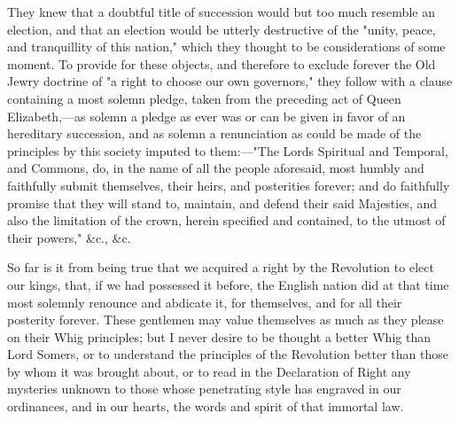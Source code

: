 They knew that a doubtful title of succession would but too much resemble an election, and that an election would be utterly destructive of the "unity, peace, and tranquillity of this nation," which they thought to be considerations of some moment. To provide for these objects, and therefore to exclude forever the Old Jewry doctrine of "a right to choose our own governors," they follow with a clause containing a most solemn pledge, taken from the preceding act of Queen Elizabeth,—as solemn a pledge as ever was or can be given in favor of an hereditary succession, and as solemn a renunciation as could be made of the principles by this society imputed to them:—"The Lords Spiritual and Temporal, and Commons, do, in the name of all the people aforesaid, most humbly and faithfully submit themselves, their heirs, and posterities forever; and do faithfully promise that they will stand to, maintain, and defend their said Majesties, and also the limitation of the crown, herein specified and contained, to the utmost of their powers," \&c., \&c.

So far is it from being true that we acquired a right by the Revolution to elect our kings, that, if we had possessed it before, the English nation did at that time most solemnly renounce and abdicate it, for themselves, and for all their posterity forever. These gentlemen may value themselves as much as they please on their Whig principles; but I never desire to be thought a better Whig than Lord Somers, or to understand the principles of the Revolution better than those by whom it was brought about, or to read in the Declaration of Right any mysteries unknown to those whose penetrating style has engraved in our ordinances, and in our hearts, the words and spirit of that immortal law.

